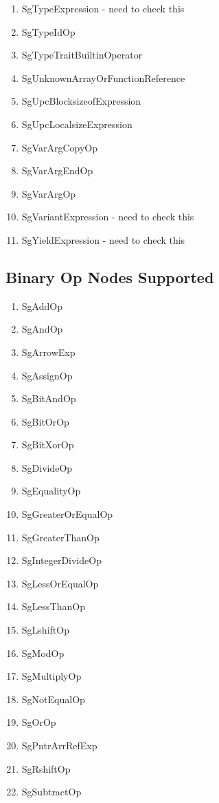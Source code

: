 \documentclass[11pt]{article}
\begin{document}
{\begin{enumeration}
\begin{enumerate}
\item SgTypeExpression - need to check this
\item SgTypeIdOp
\item SgTypeTraitBuiltinOperator
\item SgUnknownArrayOrFunctionReference
\item SgUpcBlocksizeofExpression
\item SgUpcLocalsizeExpression
\item SgVarArgCopyOp
\item SgVarArgEndOp
\item SgVarArgOp
\item SgVariantExpression - need to check this
\item SgYieldExpression - need to check this
\end{enumerate}


\subsection{Binary Op Nodes Supported}
\begin{enumerate}
\item SgAddOp
\item SgAndOp
\item SgArrowExp
\item SgAssignOp
\item SgBitAndOp
\item SgBitOrOp
\item SgBitXorOp
\item SgDivideOp
\item SgEqualityOp
\item SgGreaterOrEqualOp
\item SgGreaterThanOp
\item SgIntegerDivideOp
\item SgLessOrEqualOp
\item SgLessThanOp
\item SgLshiftOp
\item SgModOp
\item SgMultiplyOp
\item SgNotEqualOp
\item SgOrOp
\item SgPntrArrRefExp
\item SgRshiftOp
\item SgSubtractOp

\end{enumerate}


\end{enumeration}}
\end{document}
